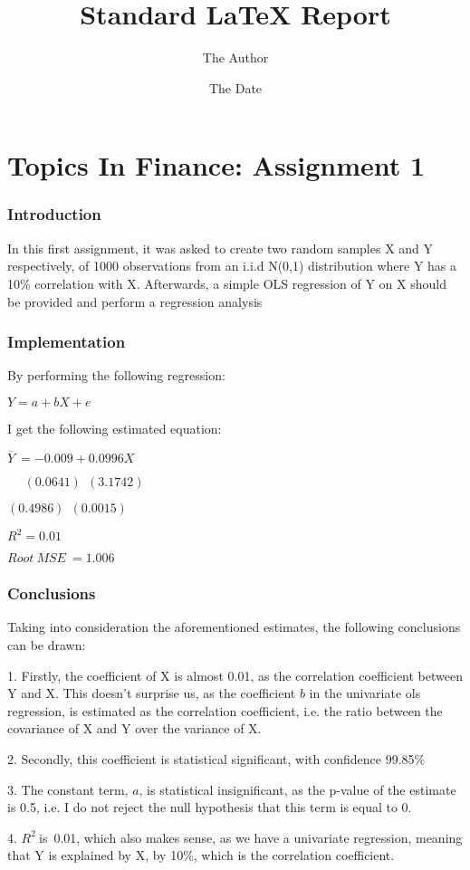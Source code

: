 \documentclass{report}
\begin{document}
\title{Standard 
\LaTeX{}
Report}
\author{The Author}
\date{The Date}
\maketitle
\tableofcontents

\part{Topics In Finance: Assignment 1}

\bigskip 

\section{\protect\bigskip Introduction}

In this first assignment, it was asked to create two random samples X and Y
respectively, of 1000 observations from an i.i.d N(0,1) distribution where Y
has a 10\% correlation with X. Afterwards, a simple OLS regression of Y on X
should be provided and perform a regression analysis

\bigskip 

\section{Implementation}

By performing the following regression:

$Y=a+bX+e~$

\bigskip I get the following estimated equation:

$\overline{Y}~=-0.009+0.0996X$

$\ \ \ \ \ \ (0.0641)~\ (3.1742)$

\qquad $(0.4986)~\ (0.0015)$

$R^{2}=0.01$

$Root~MSE~=1.006$

\section{Conclusions}

\bigskip Taking into consideration the aforementioned estimates, the
following conclusions can be drawn:

1. Firstly, the coefficient of X is almost 0.01, as the correlation
coefficient between Y and X. This doesn't surprise us, as the coefficient $b$
in the univariate ols regression, is estimated as the correlation
coefficient, i.e. the ratio between the covariance of X and Y over the
variance of X. 

2. Secondly, this coefficient is statistical significant, with confidence
99.85\%

3. The constant term, $a$, is statistical insignificant, as the p-value of
the estimate is 0.5, i.e. I do not reject the null hypothesis that this term
is equal to 0.

4. $R^{2}~$is~0.01, which also makes sense, as we have a univariate
regression, meaning that Y is explained by X, by 10\%, which is the
correlation coefficient.
\end{document}
